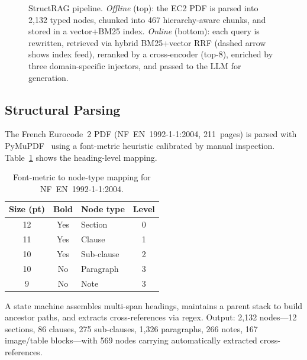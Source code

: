 \documentclass[conference]{IEEEtran}
\begin{document}
\begin{figure}[!t]
\caption{StructRAG pipeline. \textit{Offline} (top): the EC2 PDF is
  parsed into 2{,}132 typed nodes, chunked into 467 hierarchy-aware
  chunks, and stored in a vector+BM25 index.
  \textit{Online} (bottom): each query is rewritten, retrieved via
  hybrid BM25+vector RRF (dashed arrow shows index feed), reranked
  by a cross-encoder (top-8), enriched by three domain-specific
  injectors, and passed to the LLM for generation.}
\label{fig:arch}
\end{figure}

\subsection{Structural Parsing}

The French Eurocode~2 PDF (NF~EN~1992-1-1:2004, 211~pages) is parsed
with PyMuPDF~\cite{pymupdf} using a font-metric heuristic calibrated by
manual inspection.
Table~\ref{tab:font} shows the heading-level mapping.

\begin{table}[htbp]
  \centering
  \caption{Font-metric to node-type mapping for NF~EN~1992-1-1:2004.}
  \label{tab:font}
  \begin{tabular}{@{}cclc@{}}
    \toprule
    Size (pt) & Bold & Node type  & Level \\
    \midrule
    12 & Yes & Section    & 0 \\
    11 & Yes & Clause     & 1 \\
    10 & Yes & Sub-clause & 2 \\
    10 & No  & Paragraph  & 3 \\
     9 & No  & Note       & 3 \\
    \bottomrule
  \end{tabular}
\end{table}

A state machine assembles multi-span headings, maintains a parent stack
to build ancestor paths, and extracts cross-references via regex.
Output: 2{,}132 nodes---12 sections, 86 clauses, 275 sub-clauses,
1{,}326 paragraphs, 266 notes, 167 image/table blocks---with 569
nodes carrying automatically extracted cross-references.
\end{document}
